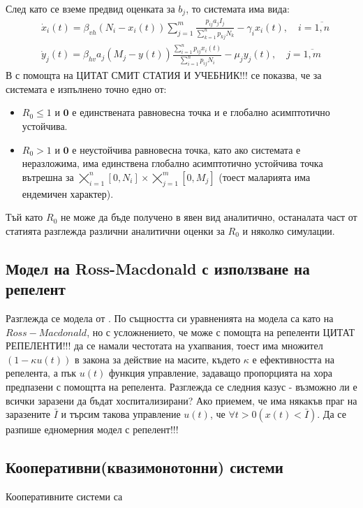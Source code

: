 След като се вземе предвид оценката за $b_j$, то системата има вида:
\begin{align*}
  &\dot{x}_i(t) =  \beta_{vh} (N_i - x_i(t)) \sum_{j=1}^{m} \frac{p_{ij} a_j I_j}{\sum_{k=1}^n p_{kj} N_k} - \gamma_i x_i(t), \quad i=\overline{1, n} \\
  &\dot{y}_j(t) = \beta_{hv} a_j (M_j - y(t)) \frac{\sum_{i=1}^n p_{ij} x_i(t)}{\sum_{i=1}^n p_{ij} N_i} - \mu_j y_j(t), \quad j=\overline{1, m}
\end{align*}
В \cite{Bichara2016} с помощта на  \color{Red} ЦИТАТ СМИТ СТАТИЯ И УЧЕБНИК!!!
\color{Black} се показва, че за системата е изпълнено точно едно от:
\begin{itemize}
  \item $R_0 \leq 1$ и $\mathbf{0}$ е единствената равновесна точка и е глобално асимптотично устойчива.
  \item $R_0 > 1$ и $\mathbf{0}$ е неустойчива равновесна точка, като ако системата е неразложима, има единствена глобално асимптотично устойчива точка вътрешна за $\bigtimes_{i=1}^{n} [0, N_i] \times \bigtimes_{j=1}^{m} [0, M_j]$ (тоест маларията има ендемичен характер).
\end{itemize}

Тъй като $R_0$ не може да бъде получено в явен вид аналитично, останалата част от статията \cite{Bichara2016} разглежда различни аналитични оценки за $R_0$ и няколко симулации.

\subsection{Модел на Ross-Macdonald с използване на репелент}
Разглежда се модела от \cite{Rashkov2019}. По същността си уравненията на модела са като на $Ross-Macdonald$, но с усложнението, че може с помощта на репеленти \color{Red} ЦИТАТ РЕПЕЛЕНТИ!!!
\color{Black} да се намали честотата на ухапвания, тоест има множител $(1 - \kappa u(t))$ в закона за действие на масите, където $\kappa$ е ефективността на репелента, а пък $u(t)$ функция управление, задаващо пропорцията на хора предпазени с помощтта на репелента.
Разглежда се следния казус - възможно ли е всички заразени да бъдат хоспитализирани? Ако приемем, че има някакъв праг на заразените $\bar{I}$ и търсим такова управление $u(t)$, че $\forall t>0 (x(t) < \bar{I})$.
\color{Red} Да се разпише едномерния модел с репелент!!!
\color{Black} \\

\subsection{Кооперативни(квазимонотонни) системи}
Кооперативните системи са
\cite{Capasso2008}
